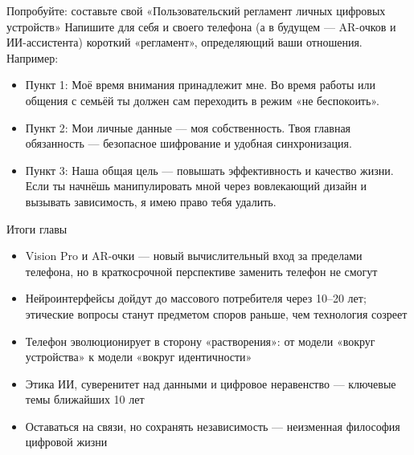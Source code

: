 \begin{tcbpractice}{Попробуйте: составьте свой «Пользовательский регламент личных цифровых устройств»}
Напишите для себя и своего телефона (а в будущем — AR-очков и ИИ-ассистента) короткий «регламент», определяющий ваши отношения. Например:

\begin{itemize}
  \item Пункт 1: Моё время внимания принадлежит мне. Во время работы или общения с семьёй ты должен сам переходить в режим «не беспокоить».
  \item Пункт 2: Мои личные данные — моя собственность. Твоя главная обязанность — безопасное шифрование и удобная синхронизация.
  \item Пункт 3: Наша общая цель — повышать эффективность и качество жизни. Если ты начнёшь манипулировать мной через вовлекающий дизайн и вызывать зависимость, я имею право тебя удалить.
\end{itemize}

\end{tcbpractice}

\begin{tcbsummary}{Итоги главы}
\begin{itemize}
  \item Vision Pro и AR-очки — новый вычислительный вход за пределами телефона, но в краткосрочной перспективе заменить телефон не смогут
  \item Нейроинтерфейсы дойдут до массового потребителя через 10–20 лет; этические вопросы станут предметом споров раньше, чем технология созреет
  \item Телефон эволюционирует в сторону «растворения»: от модели «вокруг устройства» к модели «вокруг идентичности»
  \item Этика ИИ, суверенитет над данными и цифровое неравенство — ключевые темы ближайших 10 лет
  \item Оставаться на связи, но сохранять независимость — неизменная философия цифровой жизни
\end{itemize}

\end{tcbsummary}
